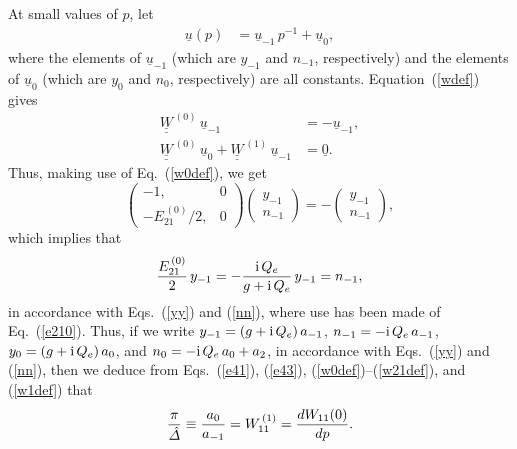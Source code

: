 \documentclass[12pt,prb,aps]{revtex4-1}
\begin{document}
At small values of $p$, let
\begin{align}
\underline{u}(p) &= \underline{u}_{-1}\,p^{-1} + \underline{u}_0,
\end{align}
where the elements of  $\underline{u}_{-1}$ (which are $y_{-1}$ and $n_{-1}$, respectively) and the elements of $\underline{u}_{0}$ (which are $y_0$ 
and $n_0$, respectively) are all constants.
Equation~(\ref{wdef}) gives 
\begin{align}
\underline{\underline{W}}^{\,(0)}\,\underline{u}_{-1} &= - \underline{u}_{-1},\\[0.5ex]
\underline{\underline{W}}^{\,(0)}\,\underline{u}_{0} + \underline{\underline{W}}^{\,(1)}\,\underline{u}_{-1} &=\underline{0}.\label{w1def}
\end{align}
Thus, making use of Eq.~(\ref{w0def}), we get
\begin{equation}
\left(\begin{array}{cc} -1,&0\\ -E_{21}^{\,(0)}/2,&0\end{array}\right) \left(\begin{array}{c}y_{-1}\\ n_{-1}\end{array}\right)= -\left(\begin{array}{c}y_{-1}\\ n_{-1}\end{array}\right),
\end{equation}
which implies that
\begin{equation}
\frac{E_{21}^{\,(0)}}{2}\,y_{-1}= - \frac{{\rm i}\,Q_e}{g+{\rm i}\,Q_e}\,y_{-1} = n_{-1},
\end{equation}
in accordance with Eqs.~(\ref{yy}) and (\ref{nn}), where use has been made of Eq.~(\ref{e210}). 
Thus, if we write
$y_{-1} = (g+{\rm i}\,Q_e)\,a_{-1}$, 
$n_{-1}= -{\rm i}\,Q_e\,a_{-1}$, 
$y_0= (g+{\rm i}\,Q_e)\,a_0$, and 
$n_0 = -{\rm i}\,Q_e\,a_0 + a_2$,
in accordance with Eqs.~(\ref{yy}) and (\ref{nn}), then we deduce from Eqs.~(\ref{e41}), (\ref{e43}), (\ref{w0def})--(\ref{w21def}),  and (\ref{w1def}) that 
\begin{equation}\label{e111}
\frac{\pi}{\hat{\mit\Delta}}\equiv \frac{a_0}{a_{-1}} = W_{11}^{\,(1)} = \frac{dW_{11}(0)}{dp}.
\end{equation}
\end{document}

